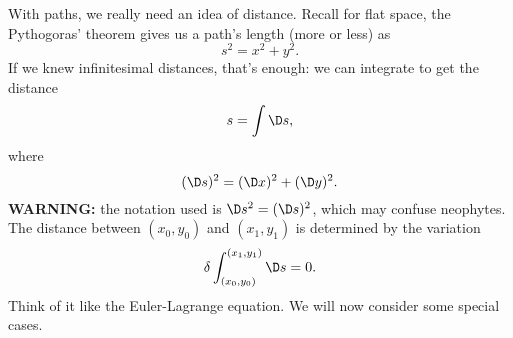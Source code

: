 With paths, we really need an idea of distance. Recall for flat
space, the Pythogoras' theorem gives us a path's length (more
or less) as
\begin{equation}
s^{2}=x^{2}+y^{2}.
\end{equation}
If we knew infinitesimal distances, that's enough: we can
integrate to get the distance
\begin{equation}
s=\int\D s,
\end{equation}
where
\begin{equation}
(\D s)^{2}=(\D x)^{2}+(\D y)^{2}.
\end{equation}
\textbf{WARNING:} the notation used is $\D s^2=(\D s)^2$, which
may confuse neophytes. The distance between $(x_0,y_0)$ and
$(x_1,y_1)$ is determined by the variation
\begin{equation}
\delta\int^{(x_1,y_1)}_{(x_0,y_0)}\D s=0.
\end{equation}
Think of it like the Euler-Lagrange equation. We will now
consider some special cases.

